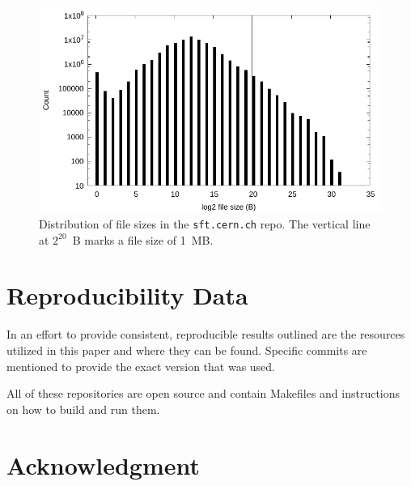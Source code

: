 \documentclass[sigconf]{acmart}
\begin{document}
\begin{figure}
\includegraphics[width=\linewidth]{plots/file-hist/sft.pdf}
\caption{Distribution of file sizes in the \texttt{sft.cern.ch} repo.
The vertical line at $2^{20}$~B marks a file size of 1~MB.}
\end{figure}


\section{Reproducibility Data}

In an effort to provide consistent, reproducible results outlined are the
resources utilized in this paper and where they can be found.
Specific commits are mentioned to provide the exact version that was used.


All of these repositories are open source and contain Makefiles
and instructions on how to build and run them.

\section*{Acknowledgment}




\end{document}
